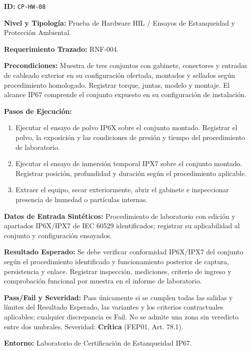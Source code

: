 \par\noindent \textbf{ID:} \texttt{CP-\allowbreak{}HW-\allowbreak{}08}\par
\par\noindent \textbf{Nivel y Tipología:} Prueba de Hardware HIL / Ensayos de Estanqueidad y Protección Ambiental.\par
\par\noindent \textbf{Requerimiento Trazado:} RNF-004.\par
\par\noindent \textbf{Precondiciones:} Muestra de tres conjuntos con gabinete, conectores y entradas de cableado exterior en su configuración ofertada, montados y sellados según procedimiento homologado. Registrar torque, juntas, modelo y montaje. El alcance IP67 comprende el conjunto expuesto en su configuración de instalación.\par
\par\noindent \textbf{Pasos de Ejecución:}\par
\begin{enumerate}
\item Ejecutar el ensayo de polvo IP6X sobre el conjunto montado. Registrar el polvo, la exposición y las condiciones de presión y tiempo del procedimiento de laboratorio.
\item Ejecutar el ensayo de inmersión temporal IPX7 sobre el conjunto montado. Registrar posición, profundidad y duración según el procedimiento aplicable.
\item Extraer el equipo, secar exteriormente, abrir el gabinete e inspeccionar presencia de humedad o partículas internas.
\end{enumerate}

\par\noindent \textbf{Datos de Entrada Sintéticos:} Procedimiento de laboratorio con edición y apartados IP6X/IPX7 de IEC 60529 identificados; registrar su aplicabilidad al conjunto y configuración ensayados.\par
\par\noindent \textbf{Resultado Esperado:} Se debe verificar conformidad IP6X/IPX7 del conjunto según el procedimiento identificado y funcionamiento posterior de captura, persistencia y enlace. Registrar inspección, mediciones, criterio de ingreso y comprobación funcional por muestra en el informe de laboratorio.\par
\par\noindent \textbf{Pass/Fail y Severidad:} Pass únicamente si se cumplen todas las salidas y límites del Resultado Esperado, las variantes y los criterios contractuales aplicables; cualquier discrepancia es Fail. No se admite una zona sin veredicto entre dos umbrales. Severidad: \textbf{Crítica} (FEP01, Art. 78.1).\par
\par\noindent \textbf{Entorno:} Laboratorio de Certificación de Estanqueidad IP67.\par

